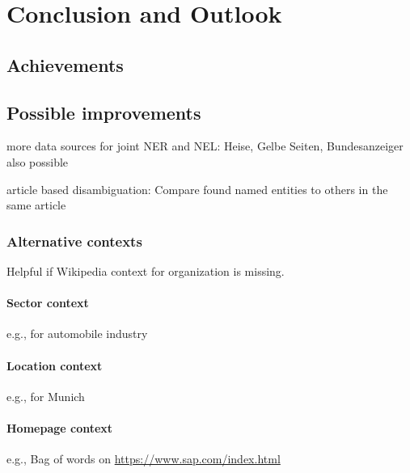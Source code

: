 \section{Conclusion and Outlook}
\label{sec:conclusion}
\subsection{Achievements}
\subsection{Possible improvements}
more data sources for joint NER and NEL: Heise, Gelbe Seiten, Bundesanzeiger also possible

article based disambiguation: Compare found named entities to others in the same article

\subsubsection{Alternative contexts}
Helpful if Wikipedia context for organization is missing.
\paragraph{Sector context}
e.g., for automobile industry
\paragraph{Location context}
e.g., for Munich
\paragraph{Homepage context}
e.g., Bag of words on \url{https://www.sap.com/index.html}
